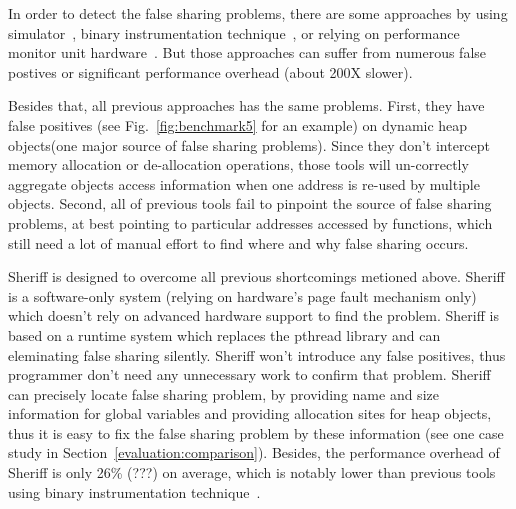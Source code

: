 \begin{comment}
There are some approaches to avoid the false sharing effects by
adjusting memory layout using compiler~\cite{falseshare:compile}, 
selecting different schedule parameters for parellel loop~\cite{falseshare:schedule}, 
and providing new memory allocator~\cite{BergerMcKinleyBlumofeWilson:ASPLOS2000}.  
Unfornately, these methods cannot avoid false sharing problems completely. 
\end{comment}
In order to detect the false sharing problems,
there are some approaches
by using simulator~\cite{falseshare:simulator}, 
binary instrumentation technique~\cite{falseshare:binaryinstrumentation1, falseshare:binaryinstrumentation2}, 
or relying on performance monitor unit hardware~\cite{detect:ptu, detect:intel}.
But those approaches can suffer from numerous false postives 
or significant performance overhead (about 200X slower). 

Besides that, all previous approaches has the same problems. 
First, they have false positives (see Fig.~\ref{fig:benchmark5} for an example) 
on dynamic heap objects(one major source of false sharing problems).
Since they don't intercept memory allocation or de-allocation operations, those tools will un-correctly 
aggregate objects access information when one address is re-used by multiple objects.
Second, all of previous tools fail to pinpoint the source of false sharing problems, 
at best pointing to particular addresses accessed by functions,
which still need a lot of manual effort to find where and why false sharing occurs.

Sheriff is designed to overcome all previous shortcomings metioned above. 
Sheriff is a software-only system (relying on hardware's page fault mechanism only) 
which doesn't rely on advanced hardware support to find the problem.
Sheriff is based on a runtime system which replaces the pthread library and can eleminating 
false sharing silently.
Sheriff won't introduce any false positives, thus programmer don't need any
unnecessary work to confirm that problem. 
Sheriff can precisely locate false sharing problem, 
by providing name and size information for global variables and providing allocation sites for heap objects, 
thus it is easy to fix the false sharing problem by these information (see one case study in 
Section~\ref{evaluation:comparison}). 
Besides, the performance overhead of Sheriff is only 26\% (???) on average, which is notably lower than
previous tools using binary instrumentation 
technique~\cite{falseshare:binaryinstrumentation1, falseshare:binaryinstrumentation2}.


